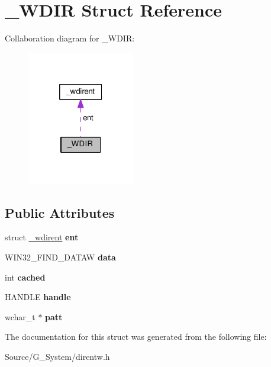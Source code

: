 \hypertarget{struct__WDIR}{}\section{\+\_\+\+W\+D\+IR Struct Reference}
\label{struct__WDIR}


Collaboration diagram for \+\_\+\+W\+D\+IR\+:\nopagebreak
\begin{figure}[H]
\begin{center}
\leavevmode
\includegraphics[width=133pt]{struct__WDIR__coll__graph}
\end{center}
\end{figure}
\subsection*{Public Attributes}
\begin{DoxyCompactItemize}
\item 
struct \hyperlink{struct__wdirent}{\+\_\+wdirent} {\bfseries ent}\hypertarget{struct__WDIR_a84ae1457352005f813ed4b3dc1994b62}{}\label{struct__WDIR_a84ae1457352005f813ed4b3dc1994b62}

\item 
W\+I\+N32\+\_\+\+F\+I\+N\+D\+\_\+\+D\+A\+T\+AW {\bfseries data}\hypertarget{struct__WDIR_a065b17b666ee06c4e8068d8accb0eef9}{}\label{struct__WDIR_a065b17b666ee06c4e8068d8accb0eef9}

\item 
int {\bfseries cached}\hypertarget{struct__WDIR_a9b7432df163d1e291ba5925347fd4af3}{}\label{struct__WDIR_a9b7432df163d1e291ba5925347fd4af3}

\item 
H\+A\+N\+D\+LE {\bfseries handle}\hypertarget{struct__WDIR_a694510e166fd3e797b3e15b9e4b3810a}{}\label{struct__WDIR_a694510e166fd3e797b3e15b9e4b3810a}

\item 
wchar\+\_\+t $\ast$ {\bfseries patt}\hypertarget{struct__WDIR_a700ff3a1096fb36452c571b0f55b4e60}{}\label{struct__WDIR_a700ff3a1096fb36452c571b0f55b4e60}

\end{DoxyCompactItemize}


The documentation for this struct was generated from the following file\+:\begin{DoxyCompactItemize}
\item 
Source/\+G\+\_\+\+System/direntw.\+h\end{DoxyCompactItemize}
